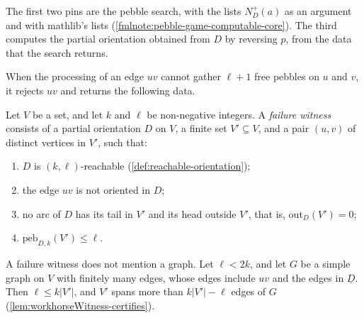 \begin{fmlnote}
  The first two pins are the pebble search, with the lists $N^+_D(a)$
  as an argument and with mathlib's lists
  (\cref{fmlnote:pebble-game-computable-core}). The third computes the
  partial orientation obtained from $D$ by reversing $p$, from the data
  that the search returns.
\end{fmlnote}

When the processing of an edge $uv$ cannot gather $\ell + 1$ free
pebbles on $u$ and $v$, it rejects $uv$ and returns the following data.

\begin{definition}
  \label{def:workhorseWitness}
  \leanok
  Let $V$ be a set, and let $k$ and $\ell$ be non-negative integers. A
  \emph{failure witness} consists of a partial orientation $D$ on $V$,
  a finite set $V' \subseteq V$, and a pair $(u, v)$ of distinct
  vertices in $V'$, such that:
  \begin{enumerate}
    \item $D$ is $(k, \ell)$-reachable
      (\cref{def:reachable-orientation});
    \item the edge $uv$ is not oriented in $D$;
    \item no arc of $D$ has its tail in $V'$ and its head outside $V'$,
      that is, $\mathrm{out}_D(V') = 0$;
    \item $\mathrm{peb}_{D, k}(V') \le \ell$.
  \end{enumerate}
\end{definition}

A failure witness does not mention a graph. Let $\ell < 2k$, and let
$G$ be a simple graph on $V$ with finitely many edges, whose edges
include $uv$ and the edges in $\underline{D}$. Then $\ell \le k|V'|$,
and $V'$ spans more than $k|V'| - \ell$ edges of $G$
(\cref{lem:workhorseWitness-certifies}).


